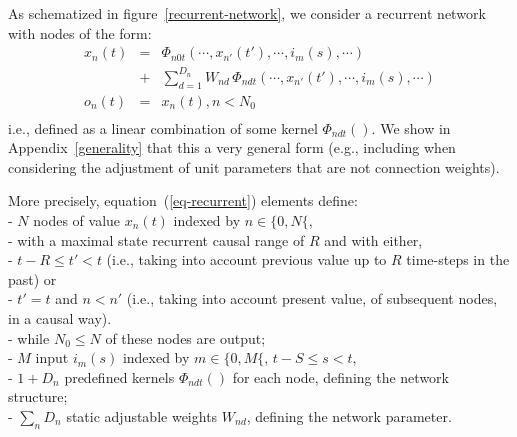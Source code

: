 As schematized in figure~\ref{recurrent-network}, we consider a recurrent network 
with nodes of the form:
\begin{equation}\label{eq-recurrent}
\begin{array}{rcl} 
x_n(t) &=& \Phi_{n0t}\left(\cdots, x_{n'}(t'), \cdots, i_{m}(s), \cdots\right) \\ 
          &+& \sum_{d = 1}^{D_{n}} W_{nd} \, \Phi_{ndt}\left(\cdots, x_{n'}(t'), \cdots, i_{m}(s), \cdots\right) \\
o_n(t) &=& x_n(t), n < N_0 \\
 \end{array}
\end{equation} 
i.e., defined as a linear combination of some kernel $\Phi_{ndt}()$.
We show in Appendix~\ref{generality} that this a very general form
(e.g., including when considering the adjustment of unit parameters
that are not connection weights).

More precisely, equation~(\ref{eq-recurrent}) elements define:
 \\  -  $N$ nodes of value $x_{n}(t)$ indexed by $n \in \{0, N\{$, 
 \\  \hphantom{0.5cm} -  with a maximal state recurrent causal range of $R$ and with either,  
 \\  \hphantom{0.8cm} -  $t - R \leq t' < t$ (i.e., taking into account previous value up to $R$ time-steps in the past) or
 \\  \hphantom{0.8cm} -  $t' = t$ and $n < n'$ (i.e., taking into account present value, of subsequent nodes, in a causal way).
 \\  \hphantom{0.5cm} - while $N_0 \leq N$ of these nodes are output;
 \\  - $M$ input $i_{m}(s)$ indexed by $m \in \{0, M\{$, $t - S \leq  s < t$, 
 \\  - $1 + D_{n}$ predefined kernels $\Phi_{ndt}\left(\right)$ for each node, defining the network structure;
 \\  - $\sum_n D_n$ static adjustable weights $W_{nd}$, defining the network parameter.

\vphantom{1cm}

